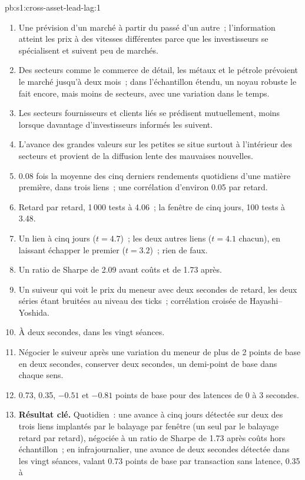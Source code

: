 \begin{solution}{pb:s1:cross-asset-lead-lag:1}
\begin{enumerate}
\item Une prévision d'un marché à partir du passé d'un autre~; l'information atteint les prix à des vitesses différentes parce que les investisseurs se spécialisent et suivent
peu de marchés.
\item Des secteurs comme le commerce de détail, les métaux et le pétrole prévoient le marché jusqu'à deux mois~; dans l'échantillon étendu, un noyau robuste le fait encore, mais
moins de secteurs, avec une variation dans le temps.
\item Les secteurs fournisseurs et clients liés se prédisent mutuellement, moins lorsque davantage d'investisseurs informés les suivent.
\item L'avance des grandes valeurs sur les petites se situe surtout à l'intérieur des secteurs et provient de la diffusion lente des mauvaises nouvelles.
\item 0.08 fois la moyenne des cinq derniers rendements quotidiens d'une matière première, dans trois liens~; une corrélation d'environ 0.05 par retard.
\item Retard par retard, 1\,000 tests à 4.06~; la fenêtre de cinq jours, 100 tests à 3.48.
\item Un lien à cinq jours ($t = 4.7$)~; les deux autres liens ($t = 4.1$ chacun), en laissant échapper le premier ($t = 3.2$)~; rien de faux.
\item Un ratio de Sharpe de 2.09 avant coûts et de 1.73 après.
\item Un suiveur qui voit le prix du meneur avec deux secondes de retard, les deux séries étant bruitées au niveau des ticks~; corrélation croisée de Hayashi--Yoshida.
\item À deux secondes, dans les vingt séances.
\item Négocier le suiveur après une variation du meneur de plus de 2 points de base en deux secondes, conserver deux secondes, un demi-point de base dans chaque sens.
\item 0.73, 0.35, $-0.51$ et $-0.81$ points de base pour des latences de 0 à 3 secondes.
\item \textbf{Résultat clé.} Quotidien~: une avance à cinq jours détectée sur deux des trois liens implantés par le balayage par fenêtre (un seul par le balayage retard par retard), négociée à un ratio de Sharpe
de 1.73 après coûts hors échantillon~; en infrajournalier, une avance de deux secondes détectée dans les vingt séances, valant 0.73 points de base par transaction sans latence, 0.35 à

\end{enumerate}
\end{solution}
